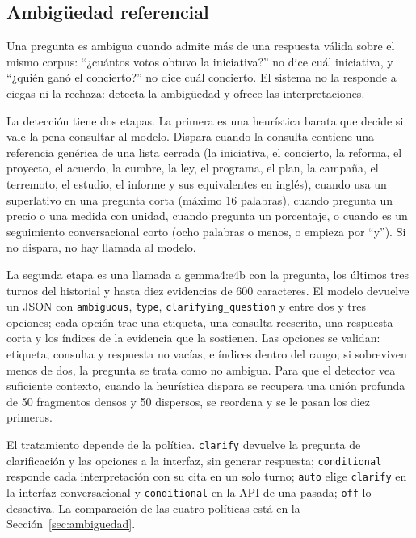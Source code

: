 \subsection{Ambig\"uedad referencial}
\label{sec:ambiguedad-metodo}

Una pregunta es ambigua cuando admite m\'as de una respuesta v\'alida sobre el mismo corpus: ``¿cu\'antos votos obtuvo la iniciativa?'' no dice cu\'al iniciativa, y ``¿qui\'en gan\'o el concierto?'' no dice cu\'al concierto. El sistema no la responde a ciegas ni la rechaza: detecta la ambig\"uedad y ofrece las interpretaciones.

La detecci\'on tiene dos etapas. La primera es una heur\'istica barata que decide si vale la pena consultar al modelo. Dispara cuando la consulta contiene una referencia gen\'erica de una lista cerrada (la iniciativa, el concierto, la reforma, el proyecto, el acuerdo, la cumbre, la ley, el programa, el plan, la campa\~na, el terremoto, el estudio, el informe y sus equivalentes en ingl\'es), cuando usa un superlativo en una pregunta corta (m\'aximo 16 palabras), cuando pregunta un precio o una medida con unidad, cuando pregunta un porcentaje, o cuando es un seguimiento conversacional corto (ocho palabras o menos, o empieza por ``y''). Si no dispara, no hay llamada al modelo.

La segunda etapa es una llamada a gemma4:e4b con la pregunta, los \'ultimos tres turnos del historial y hasta diez evidencias de 600 caracteres. El modelo devuelve un JSON con \texttt{ambiguous}, \texttt{type}, \texttt{clarifying\_question} y entre dos y tres opciones; cada opci\'on trae una etiqueta, una consulta reescrita, una respuesta corta y los \'indices de la evidencia que la sostienen. Las opciones se validan: etiqueta, consulta y respuesta no vac\'ias, e \'indices dentro del rango; si sobreviven menos de dos, la pregunta se trata como no ambigua. Para que el detector vea suficiente contexto, cuando la heur\'istica dispara se recupera una uni\'on profunda de 50 fragmentos densos y 50 dispersos, se reordena y se le pasan los diez primeros.

El tratamiento depende de la pol\'itica. \texttt{clarify} devuelve la pregunta de clarificaci\'on y las opciones a la interfaz, sin generar respuesta; \texttt{conditional} responde cada interpretaci\'on con su cita en un solo turno; \texttt{auto} elige \texttt{clarify} en la interfaz conversacional y \texttt{conditional} en la API de una pasada; \texttt{off} lo desactiva. La comparaci\'on de las cuatro pol\'iticas est\'a en la Secci\'on~\ref{sec:ambiguedad}.

